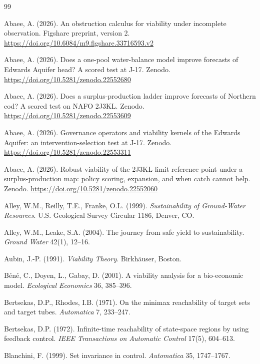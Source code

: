 \documentclass[11pt,a4paper]{article}
\theoremstyle{plain}
\theoremstyle{definition}
\theoremstyle{remark}
\begin{document}
\begin{thebibliography}{99}\footnotesize

 Abaee, A. (2026). An obstruction calculus for viability under incomplete observation. Figshare preprint, version 2. \url{https://doi.org/10.6084/m9.figshare.33716593.v2}

 Abaee, A. (2026). Does a one-pool water-balance model improve forecasts of Edwards Aquifer head? A scored test at J-17. Zenodo. \url{https://doi.org/10.5281/zenodo.22552680}

 Abaee, A. (2026). Does a surplus-production ladder improve forecasts of Northern cod? A scored test on NAFO 2J3KL. Zenodo. \url{https://doi.org/10.5281/zenodo.22553609}

 Abaee, A. (2026). Governance operators and viability kernels of the Edwards Aquifer: an intervention-selection test at J-17. Zenodo. \url{https://doi.org/10.5281/zenodo.22553311}

 Abaee, A. (2026). Robust viability of the 2J3KL limit reference point under a surplus-production map: policy scoring, expansion, and when catch cannot help. Zenodo. \url{https://doi.org/10.5281/zenodo.22552060}

 Alley, W.M., Reilly, T.E., Franke, O.L. (1999). \emph{Sustainability of Ground-Water Resources}. U.S. Geological Survey Circular 1186, Denver, CO.

 Alley, W.M., Leake, S.A. (2004). The journey from safe yield to sustainability. \emph{Ground Water} 42(1), 12--16.

 Aubin, J.-P. (1991). \emph{Viability Theory}. Birkh\"auser, Boston.

 B\'en\'e, C., Doyen, L., Gabay, D. (2001). A viability analysis for a bio-economic model. \emph{Ecological Economics} 36, 385--396.

 Bertsekas, D.P., Rhodes, I.B. (1971). On the minimax reachability of target sets and target tubes. \emph{Automatica} 7, 233--247.

 Bertsekas, D.P. (1972). Infinite-time reachability of state-space regions by using feedback control. \emph{IEEE Transactions on Automatic Control} 17(5), 604--613.

 Blanchini, F. (1999). Set invariance in control. \emph{Automatica} 35, 1747--1767.


\end{thebibliography}
\end{document}
